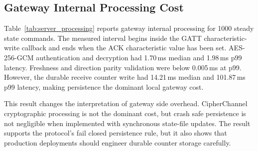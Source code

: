\documentclass[journal]{IEEEtran}
\begin{document}
\subsection{Gateway Internal Processing Cost}

Table~\ref{tab:server_processing} reports gateway internal processing for 1000 steady state commands. The measured interval begins inside the GATT characteristic-write callback and ends when the ACK characteristic value has been set. AES-256-GCM authentication and decryption had 1.70\,ms median and 1.98\,ms p99 latency. Freshness and direction parity validation were below 0.005\,ms at p99. However, the durable receive counter write had 14.21\,ms median and 101.87\,ms p99 latency, making persistence the dominant local gateway cost.

\begin{table}[!t]
\renewcommand{\arraystretch}{1.12}
\caption{Gateway Side Receive-to-ACK Processing Breakdown (ms, $N=1000$)}
\label{tab:server_processing}
\centering
{}
\end{table}

This result changes the interpretation of gateway side overhead. CipherChannel cryptographic processing is not the dominant cost, but crash safe  persistence is not negligible when implemented with synchronous state-file updates. The result supports the protocol's fail closed persistence rule, but it also shows that production deployments should engineer durable counter storage carefully.
\end{document}
